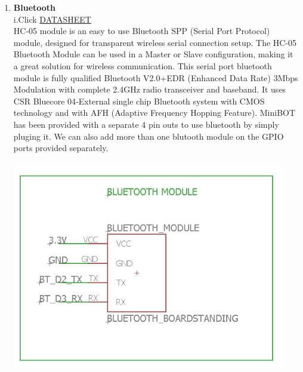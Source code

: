 \documentclass[a4paper,12pt,oneside]{book}
\begin{document}
\begin{enumerate}
    
    
    \item \textbf{Bluetooth}\\
    i.Click \href{http://www.electronicaestudio.com/docs/istd016A.pdf}{DATASHEET}
    \\[0.5cm]HC‐05 module is an easy to use Bluetooth SPP (Serial Port Protocol) module, designed for transparent wireless serial connection setup. The HC-05 Bluetooth Module can be used in a Master or Slave configuration, making it a great solution for wireless communication. This serial port bluetooth module is fully qualified Bluetooth V2.0+EDR (Enhanced Data Rate) 3Mbps Modulation with complete 2.4GHz radio transceiver and baseband. It uses CSR Bluecore 04‐External single chip Bluetooth system with CMOS technology and with AFH (Adaptive Frequency Hopping Feature).
    MiniBOT has been provided with a separate 4 pin outs to use bluetooth by simply pluging it. We can also add more than one blutooth module on the GPIO ports provided separately.
    \\\hfill\includegraphics[width=12cm, height=10cm]{bluetooth}
    

\end{enumerate}
\end{document}
